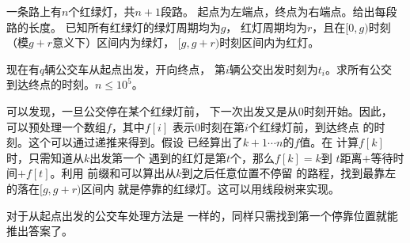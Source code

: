 \begin{prob}
	一条路上有$n$个红绿灯，共$n+1$段路。
	起点为左端点，终点为右端点。给出每段路的长度。
	已知所有红绿灯的绿灯周期均为$g$，
	红灯周期均为$r$，且在$[0, g)$时刻（模$g+r$意义下）区间内为绿灯，
	$[g, g+r)$时刻区间内为红灯。\par
	现在有$q$辆公交车从起点出发，开向终点，
	第$i$辆公交出发时刻为$t_i$。求所有公交
	到达终点的时刻。$n \le 10^5$。
\end{prob}

\begin{sol}
	可以发现，一旦公交停在某个红绿灯前，
	下一次出发又是从$0$时刻开始。因此，
	可以预处理一个数组$f$，其中$f[i]$
	表示$0$时刻在第$i$个红绿灯前，到达终点
	的时刻。这个可以通过递推来得到。假设
	已经算出了$k+1 \cdots n$的$f$值。在
	计算$f[k]$时，只需知道从$k$出发第一个
	遇到的红灯是第$t$个，那么$f[k]=$$k$到
	$t$距离$+$等待时间$+f[t]$。利用
	前缀和可以算出从$k$到之后任意位置不停留
	的路程，找到最靠左的落在$[g,g+r)$区间内
	就是停靠的红绿灯。这可以用线段树来实现。
	\par 对于从起点出发的公交车处理方法是
	一样的，同样只需找到第一个停靠位置就能
	推出答案了。
\end{sol}
